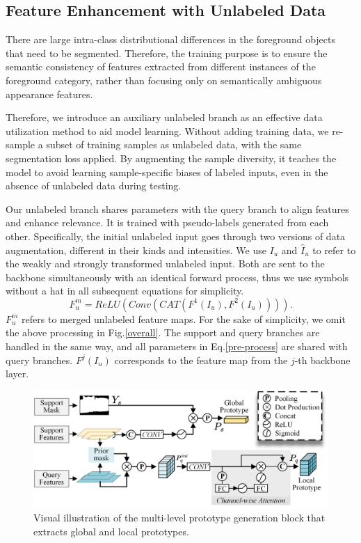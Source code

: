 \documentclass[letterpaper]{article} %
\begin{document}
\subsection{Feature Enhancement with Unlabeled Data}
There are large intra-class distributional differences in the foreground objects that need to be segmented. Therefore, the training purpose is to ensure
the semantic consistency of features extracted from different instances of the foreground category, rather than focusing only on semantically ambiguous appearance features.

Therefore, we introduce an auxiliary unlabeled branch as an effective data utilization method to aid model learning. Without adding training data, we re-sample a subset of training samples as unlabeled data, with the same segmentation loss applied. By augmenting the sample diversity, it teaches the model to avoid learning sample-specific biases of labeled inputs, even in the absence of unlabeled data during testing.

Our unlabeled branch shares parameters with the query branch to align features and enhance relevance. It is trained with pseudo-labels generated from each other. Specifically, the initial unlabeled input goes through two versions of data augmentation, different in their kinds and intensities. We use $I_u$ and $\hat{I}_u$ to refer to the weakly and strongly transformed unlabeled input. Both are sent to the backbone simultaneously with an identical forward process, thus we use symbols without a hat in all subsequent equations for simplicity.
\begin{equation}
\label{pre-process}
	F^{m}_u = ReLU(Conv(CAT(F^{1}(I_u),F^{2}(I_u)))).
\end{equation}%
$F^{m}_u$ refers to merged unlabeled feature maps. For the sake of simplicity, we omit the above processing in Fig.\ref{overall}. The support and query branches are handled in the same way, and all parameters in Eq.\ref{pre-process} are shared with query branches. $F^j(I_u)$ corresponds to the feature map from the $j$-th backbone layer.
\begin{figure}
\centering
   \includegraphics[width=\linewidth]{generation.pdf}

   \caption{Visual illustration of the multi-level prototype generation block that extracts global and local prototypes. }
\label{generation}
\end{figure}
\end{document}
